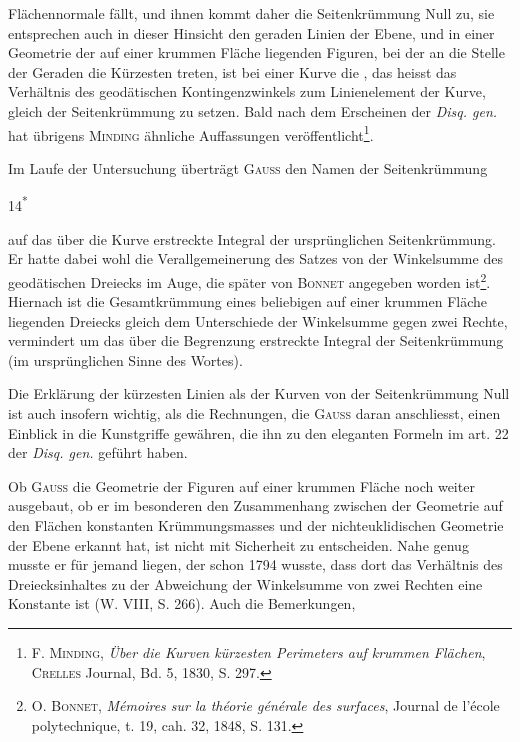 Flächennormale fällt, und ihnen kommt daher die Seitenkrümmung Null zu,
sie entsprechen auch in dieser Hinsicht den geraden Linien der Ebene, und
in einer Geometrie der auf einer krummen Fläche liegenden Figuren, bei der
an die Stelle der Geraden die Kürzesten treten, ist bei einer Kurve die ,
das heisst das Verhältnis des geodätischen Kontingenzwinkels
zum Linienelement der Kurve, gleich der Seitenkrümmung zu setzen.
Bald nach dem Erscheinen der \textit{Disq. gen.} hat übrigens \textsc{Minding} ähnliche Auffassungen
veröffentlicht\footnote{\textsc{F. Minding}, \textit{Über die Kurven kürzesten Perimeters auf krummen Flächen}, \textsc{Crelles} Journal, Bd. 5, 1830, S. 297.}.
\par
Im Laufe der Untersuchung überträgt \textsc{Gauss} den Namen der Seitenkrümmung
\par\smallskip\noindent\hfill{\small 14\textsuperscript{*}}\par
\clearpage{}\setcounter{footnote}{0}
\noindent auf das über die Kurve erstreckte Integral der ursprünglichen
Seitenkrümmung. Er hatte dabei wohl die Verallgemeinerung des Satzes von
der Winkelsumme des geodätischen Dreiecks im Auge, die später von \textsc{Bonnet}
angegeben worden ist\footnote{\textsc{O. Bonnet}, \textit{Mémoires sur la théorie générale des surfaces}, Journal de l’école polytechnique, t. 19, cah. 32, 1848, S. 131.}. Hiernach ist die Gesamtkrümmung eines beliebigen
auf einer krummen Fläche liegenden Dreiecks gleich dem Unterschiede der
Winkelsumme gegen zwei Rechte, vermindert um das über die Begrenzung
erstreckte Integral der Seitenkrümmung (im ursprünglichen Sinne des Wortes).
\par
Die Erklärung der kürzesten Linien als der Kurven von der Seitenkrümmung
Null ist auch insofern wichtig, als die Rechnungen, die \textsc{Gauss}
daran anschliesst, einen Einblick in die Kunstgriffe gewähren, die ihn zu den
eleganten Formeln im art. 22 der \textit{Disq. gen.} geführt haben.
\par
Ob \textsc{Gauss} die Geometrie der Figuren auf einer krummen Fläche noch
weiter ausgebaut, ob er im besonderen den Zusammenhang zwischen der Geometrie
auf den Flächen konstanten Krümmungsmasses und der nichteuklidischen
Geometrie der Ebene erkannt hat, ist nicht mit Sicherheit zu entscheiden.
Nahe genug musste er für jemand liegen, der schon 1794 wusste, dass dort
das Verhältnis des Dreiecksinhaltes zu der Abweichung der Winkelsumme von
zwei Rechten eine Konstante ist (W. VIII, S. 266). Auch die Bemerkungen,
